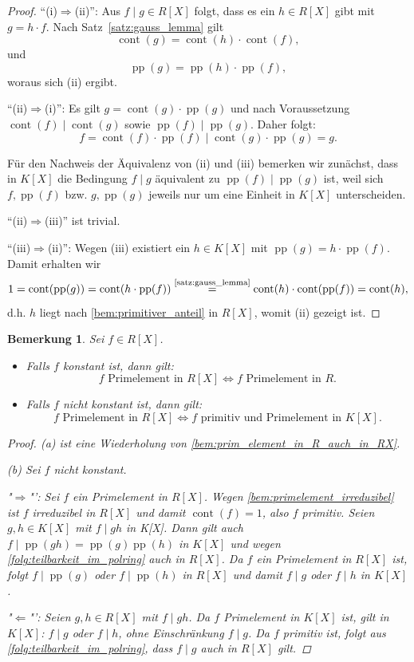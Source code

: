 \documentclass[a4paper, twoside, 11pt, ngerman]{report}
\DeclareMathOperator{\cont}{cont}
\DeclareMathOperator{\pp}{pp}
\theoremstyle{definistyle}
\newtheorem{bem}[satz]{Bemerkung}
\theoremstyle{remark}
\begin{document}
\begin{proof}
"`(i)$\Rightarrow$(ii)"': Aus $f\mid g \in R[X]$ folgt, dass es ein $h \in R[X]$ gibt mit $g = h \cdot f$. Nach Satz~\ref{satz:gauss_lemma} gilt
\[
\cont(g) = \cont(h) \cdot \cont(f),
\]
und
\[
\pp(g) = \pp(h) \cdot \pp(f),
\]
woraus sich (ii) ergibt.

"`(ii)$\Rightarrow$(i)"': Es gilt $g = \cont(g) \cdot \pp(g)$ und nach Voraussetzung $\cont(f) \mid \cont(g)$ sowie $\pp(f) \mid \pp(g)$. Daher folgt:
\[
f = \cont(f) \cdot \pp(f) \mid \cont(g) \cdot \pp(g) =g .
\]

Für den Nachweis der Äquivalenz von (ii) und (iii) bemerken wir zunächst, dass in $K[X]$ die Bedingung $f\mid g$ äquivalent zu $\pp(f)\mid\pp(g)$ ist, weil sich $f,\pp(f)$ bzw. $g,\pp(g)$ jeweils nur um eine Einheit in $K[X]$ unterscheiden.

"`(ii)$\Rightarrow$(iii)"' ist trivial.

"`(iii)$\Rightarrow$(ii)"': Wegen (iii) existiert ein $h \in K[X]$ mit $\pp(g) = h \cdot \pp(f)$. Damit erhalten wir
\[
1 = \cont(\pp(g)) = \cont(h \cdot \pp(f)) \stackrel{\text{\ref{satz:gauss_lemma}}}{=} \cont(h) \cdot \cont(\pp(f))
=\cont(h),\]
d.h. $h$ liegt nach \ref{bem:primitiver_anteil} in $R[X]$, womit (ii) gezeigt ist.
\end{proof}


\begin{bem}\label{bem:polynomringe_primelemente}
Sei $f \in R[X]$.
\begin{itemize}
    \item[(a)] Falls $f$ konstant ist, dann gilt:
    \[
    f \text{ Primelement in } R[X] \iff f \text{ Primelement in } R.
    \]
    \item[(b)] Falls $f$ nicht konstant ist, dann gilt:
    \[
    f \text{ Primelement in } R[X] \iff f \text{ primitiv und Primelement in } K[X].
    \]
\end{itemize}

\begin{proof}
(a) ist eine Wiederholung von \ref{bem:prim_element_in_R_auch_in_RX}.

(b) Sei $f$ nicht konstant.

"$\Rightarrow$"': Sei $f$ ein Primelement in $R[X]$. Wegen \ref{bem:primelement_irreduzibel} ist $f$ irreduzibel in $R[X]$ und damit $\cont(f)=1$, also $f$ primitiv. Seien $g,h\in K[X]$ mit $f\mid gh$ in K[X]. Dann gilt auch $f\mid\pp(gh)=\pp(g)\pp(h)$ in $K[X]$ und wegen
\ref{folg:teilbarkeit_im_polring} auch in $R[X]$. Da $f$ ein Primelement in $R[X]$ ist, folgt $f\mid\pp(g)$
oder $f\mid\pp(h)$ in $R[X]$ und damit $f\mid g$ oder $f\mid h$ in $K[X]$.

"$\Leftarrow$"': 
Seien $g,h\in R[X]$ mit $f\mid gh$.
Da $f$ Primelement in $K[X]$ ist, gilt in $K[X]$: $f\mid g$ oder $f\mid h$, ohne Einschränkung $f\mid g$. Da $f$ primitiv ist, folgt aus \ref{folg:teilbarkeit_im_polring}, dass $f\mid g$ auch in $R[X]$ gilt.
\end{proof}
\end{bem}
\end{document}
